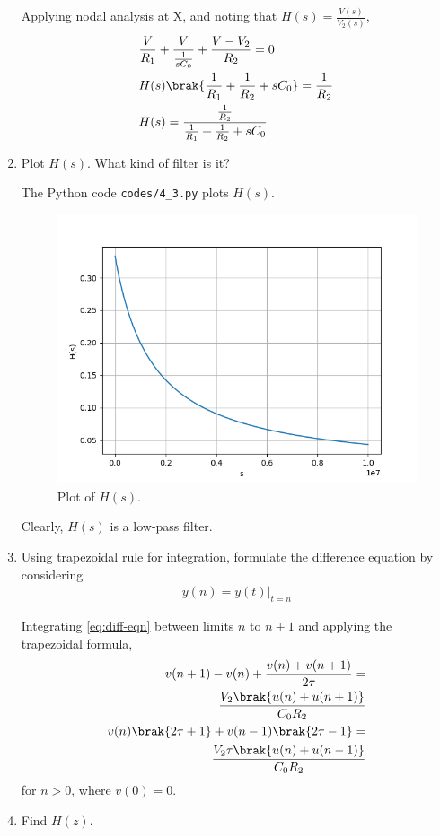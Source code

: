 \documentclass[journal,12pt,twocolumn]{IEEEtran}
\renewcommand\thesection{\arabic{section}}
\begin{document}
\begin{enumerate}[label=\arabic*.,ref=\thesection.\theenumi]
		Applying nodal analysis at X, and noting that 
		$H(s) = \frac{V(s)}{V_2(s)}$,
		\begin{align}
			&\frac{V}{R_1} + \frac{V}{\frac{1}{sC_0}} + \frac{V - V_2}{R_2} = 0 \\
			&H(s)\brak{\frac{1}{R_1} + \frac{1}{R_2} + sC_0} = \frac{1}{R_2} \\
			&H(s) = \frac{\frac{1}{R_2}}{\frac{1}{R_1} + \frac{1}{R_2} + sC_0}
			\label{eq:Hs}
		\end{align}
		\item Plot $H(s)$. What kind of filter is it?
		
		\solution The Python code \texttt{codes/4\_3.py} plots $H(s)$.
		\begin{figure}[!ht]
			\includegraphics[width=\columnwidth]{figs/4_3.png}
			\caption{Plot of $H(s)$.}
			\label{fig:Hs}
		\end{figure}
		Clearly, $H(s)$ is a low-pass filter.
		\item Using trapezoidal rule for integration, formulate the difference
		equation by considering 
		\begin{align}
			y(n) = y(t)\vert_{t=n}
		\end{align}
		
		\solution Integrating \eqref{eq:diff-eqn} between limits $n$ to $n+1$ 
		and applying the trapezoidal formula,
		\begin{align}
			v(n+1) - v(n) + \frac{v(n) + v(n+1)}{2\tau} = \nonumber\\
			\frac{V_2\brak{u(n)+u(n+1)}}{C_0R_2} \\
			v(n)\brak{2\tau+1} + v(n-1)\brak{2\tau-1} = \nonumber\\ 
			\frac{V_2\tau\brak{u(n)+u(n-1)}}{C_0R_2}
			\label{eq:difference-eqn}
		\end{align}
		for $n > 0$, where $v(0) = 0$.
		\item Find $H(z)$.
		

\end{enumerate}
\end{document}
